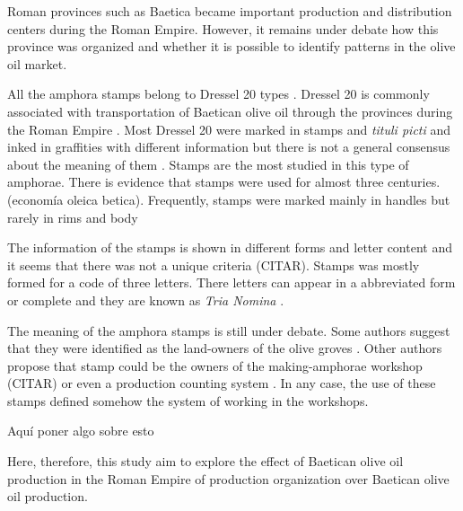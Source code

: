 \documentclass[review]{elsarticle}
\begin{document}
Roman provinces such as Baetica became important production and distribution centers during the Roman Empire. However, it remains under debate how this province was organized and whether it is possible to identify patterns in the olive oil market. 



All the amphora stamps belong to Dressel 20 types \citep{dressel,martin-kilcher_romischen_1994}. Dressel 20 is commonly associated with transportation of Baetican olive oil through the provinces during the Roman Empire \citep{berni_millet_epigrafianforica_2008}. Most Dressel 20 were marked in stamps and \textit{tituli picti} and inked in graffities with different information but there is not a general consensus about the meaning of them \citep{rodriguez_baetican_1998}. Stamps are the most studied in this type of amphorae. There is evidence that stamps were used for almost three centuries. (economía oleica betica). Frequently, stamps were marked mainly in handles but rarely in rims and body \citep{millet_anforas_1998}

The information of the stamps is shown in different forms and letter content and it seems that there was not a unique criteria (CITAR). Stamps was mostly formed for a code of three letters. There letters can appear in a abbreviated form or complete and they are known as \textit{Tria Nomina} \citep{berni_millet_amphora_1996}. 


The meaning of the amphora stamps is still under debate. Some authors suggest that they were identified as the land-owners of the olive groves \citep{rodriguez_economioleicola_1977}. Other authors propose that stamp could be the owners of the making-amphorae workshop (CITAR) or even a production counting system \citep{berni_millet_epigrafianforica_2008}. In any case, the use of these stamps defined somehow the system of working in the workshops. 

Aquí poner algo sobre esto \citep{remesal_anforas_2004}

Here, therefore, this study aim to explore the effect of Baetican olive oil production in the Roman Empire
of production organization over Baetican olive oil production. 
\end{document}
